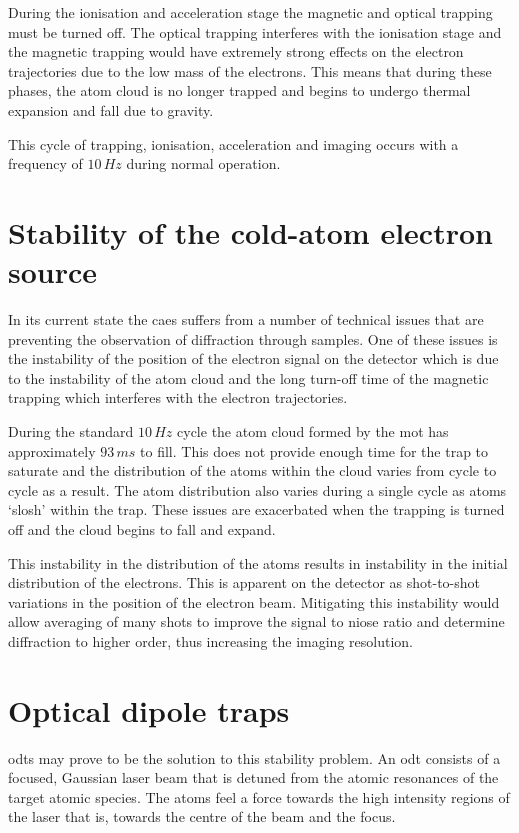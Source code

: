 During the ionisation and acceleration stage the magnetic and optical trapping must be turned off. The optical trapping interferes with the ionisation stage and the magnetic trapping would have extremely strong effects on the electron trajectories due to the low mass of the electrons. This means that during these phases, the atom cloud is no longer trapped and begins to undergo thermal expansion and fall due to gravity.

This cycle of trapping, ionisation, acceleration and imaging occurs with a frequency of $10\,\unit{Hz}$ during normal operation.

\section{Stability of the cold-atom electron source}

In its current state the \gls{caes} suffers from a number of technical issues that are preventing the observation of diffraction through samples. One of these issues is the instability of the position of the electron signal on the detector which is due to the instability of the atom cloud and the long turn-off time of the magnetic trapping which interferes with the electron trajectories.

During the standard $10\,\unit{Hz}$ cycle the atom cloud formed by the \gls{mot} has approximately $93\,\unit{ms}$ to fill. This does not provide enough time for the trap to saturate and the distribution of the atoms within the cloud varies from cycle to cycle as a result. The atom distribution also varies during a single cycle as atoms `slosh' within the trap. These issues are exacerbated when the trapping is turned off and the cloud begins to fall and expand.

This instability in the distribution of the atoms results in instability in the initial distribution of the electrons. This is apparent on the detector as shot-to-shot variations in the position of the electron beam. Mitigating this instability would allow averaging of many shots to improve the signal to niose ratio and determine diffraction to higher order, thus increasing the imaging resolution.

\section{Optical dipole traps}

\Glspl{odt} may prove to be the solution to this stability problem. An \gls{odt} consists of a focused, Gaussian laser beam that is detuned from the atomic resonances of the target atomic species. The atoms feel a force towards the high intensity regions of the laser that is, towards the centre of the beam and the focus.

